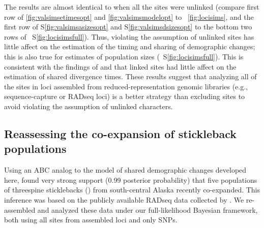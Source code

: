 The results are almost identical to when all the sites were unlinked
(compare first row of
\figs
\ref{fig:valsimsetimesopt}
and
\ref{fig:valsimsmodelopt}
to
\fig{}~\ref{fig:locisims},
and the first row of
\figs
S\ref{fig:valsimsasizesopt}
and
S\ref{fig:valsimsdsizesopt}
to the bottom two rows of
\fig{}~S\ref{fig:locisimsfull}).
Thus, violating the assumption of unlinked sites has little
affect on the estimation of the timing and sharing of
demographic changes;
this is also true for estimates of population sizes
(\fig{}~S\ref{fig:locisimsfull}).
This is consistent with the findings of
\citet{Oaks2018ecoevolity} and
\citet{Oaks2018paic}
that linked sites had little affect on the estimation of
shared divergence times.
These results suggest that analyzing all of the sites in loci assembled from
reduced-representation genomic libraries (e.g., sequence-capture or RADseq
loci) is a better strategy than excluding sites to avoid violating the
assumption of unlinked characters.

\ifembed{

}{}




\subsection{Reassessing the co-expansion of stickleback populations}

Using an ABC analog to the model of shared demographic changes developed here,
\citet{Xue2015} found very strong support (0.99 posterior probability) that
five populations of threespine sticklebacks ()
from south-central Alaska recently
co-expanded.
This inference was based on the publicly available RADseq data collected by
\citet{Hohenlohe2010}.
We re-assembled and analyzed these data under our full-likelihood
Bayesian framework, both using all sites from assembled loci
and only SNPs.


